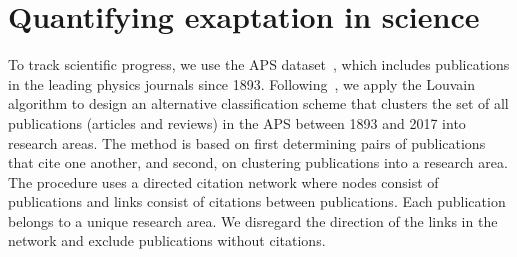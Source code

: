 \documentclass[draft,final]{vutinfth} %
\begin{document}
\section{Quantifying exaptation in science}
To track scientific progress, we use the APS dataset~\cite{apsdataset}, which includes publications in the leading physics journals since 1893. Following~\cite{blondel2008fast}, we apply the Louvain algorithm to design an alternative classification scheme that clusters the set of all publications (articles and reviews) in the APS between 1893 and 2017 into research areas. The method is based on first determining pairs of publications that cite one another, and second, on clustering publications into a research area. The procedure uses a directed citation network where nodes consist of publications and links consist of citations between publications. Each publication belongs to a unique research area. We disregard the direction of the links in the network and exclude publications without citations.
\end{document}
